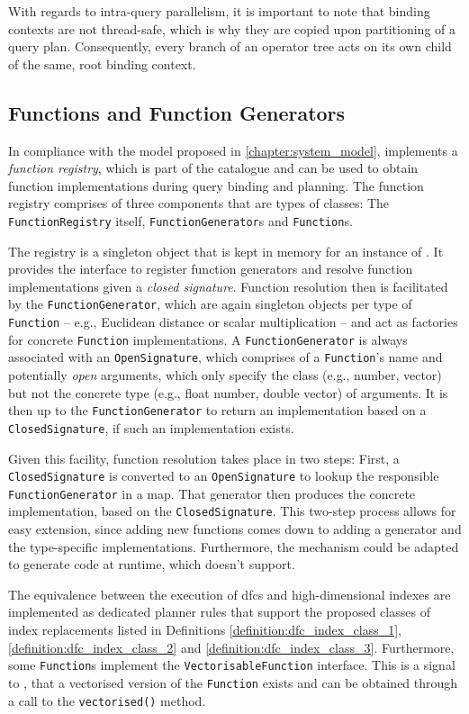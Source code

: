 With regards to intra-query parallelism, it is important to note that binding contexts are not thread-safe, which is why they are copied upon partitioning of a query plan. Consequently, every branch of an operator tree acts on its own child of the same, root binding context.

\subsection{Functions and Function Generators}

In compliance with the model proposed in \cref{chapter:system_model}, \cottontail{} implements a \emph{function registry}, which is part of the catalogue and can be used to obtain function implementations during query binding and planning. The function registry comprises of three components that are types of classes: The \texttt{FunctionRegistry} itself, \texttt{FunctionGenerator}s and \texttt{Function}s.

The registry is a singleton object that is kept in memory for an instance of \cottontail{}. It provides the interface to register function generators and resolve function implementations given a \emph{closed signature}. Function resolution then is facilitated by the \texttt{FunctionGenerator}, which are again singleton objects per type of \texttt{Function} -- e.g., Euclidean distance or scalar multiplication -- and act as factories for concrete \texttt{Function} implementations. A \texttt{FunctionGenerator} is always associated with an \texttt{OpenSignature}, which comprises of a \texttt{Function}'s name and potentially \emph{open} arguments, which only specify the class (e.g., number, vector) but not the concrete type (e.g., float number, double vector) of arguments. It is then up to the \texttt{FunctionGenerator} to return an implementation based on a \texttt{ClosedSignature}, if such an implementation exists.

Given this facility, function resolution takes place in two steps: First, a \texttt{ClosedSignature} is converted to an \texttt{OpenSignature} to lookup the responsible \texttt{FunctionGenerator} in a map. That generator then produces the concrete implementation, based on the \texttt{ClosedSignature}. This two-step process allows for easy extension, since adding new functions comes down to adding a generator and the type-specific implementations. Furthermore, the mechanism could be adapted to generate code at runtime, which \cottontail{} doesn't support.

The equivalence between the execution of \acrshort{dfc}s and high-dimensional indexes are implemented as dedicated planner rules that support the proposed classes of index replacements listed in Definitions \ref{definition:dfc_index_class_1}, \ref{definition:dfc_index_class_2} and \ref{definition:dfc_index_class_3}. Furthermore, some \texttt{Function}s implement the \texttt{VectorisableFunction} interface. This is a signal to \cottontail{}, that a vectorised version of the \texttt{Function} exists and can be obtained through a call to the \texttt{vectorised()} method.

